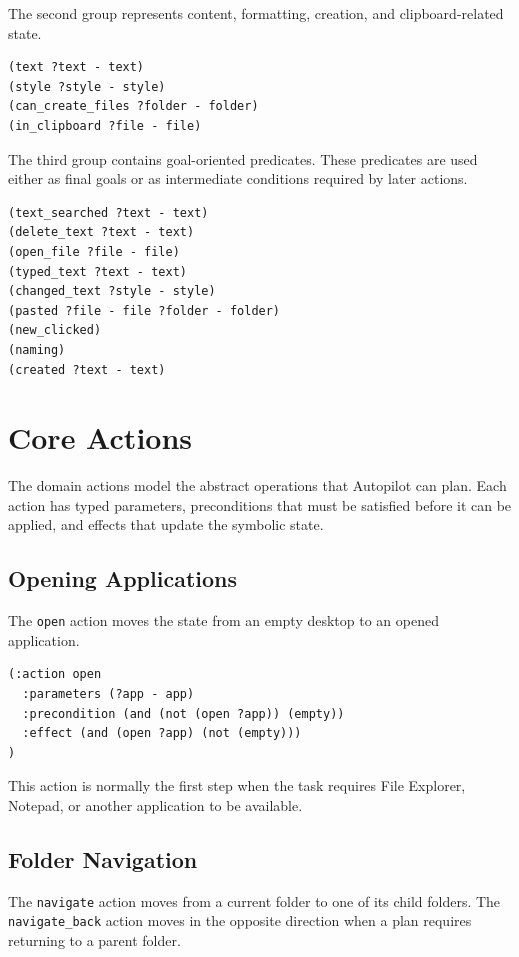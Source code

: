 The second group represents content, formatting, creation, and clipboard-related state.

\begin{lstlisting}
(text ?text - text)
(style ?style - style)
(can_create_files ?folder - folder)
(in_clipboard ?file - file)
\end{lstlisting}

The third group contains goal-oriented predicates. These predicates are used either as final goals or as intermediate conditions required by later actions.

\begin{lstlisting}
(text_searched ?text - text)
(delete_text ?text - text)
(open_file ?file - file)
(typed_text ?text - text)
(changed_text ?style - style)
(pasted ?file - file ?folder - folder)
(new_clicked)
(naming)
(created ?text - text)
\end{lstlisting}

\section{Core Actions}

The domain actions model the abstract operations that Autopilot can plan. Each action has typed parameters, preconditions that must be satisfied before it can be applied, and effects that update the symbolic state.

\subsection{Opening Applications}

The \texttt{open} action moves the state from an empty desktop to an opened application.

\begin{lstlisting}
(:action open
  :parameters (?app - app)
  :precondition (and (not (open ?app)) (empty))
  :effect (and (open ?app) (not (empty)))
)
\end{lstlisting}

This action is normally the first step when the task requires File Explorer, Notepad, or another application to be available.

\subsection{Folder Navigation}

The \texttt{navigate} action moves from a current folder to one of its child folders. The \texttt{navigate\_back} action moves in the opposite direction when a plan requires returning to a parent folder.

